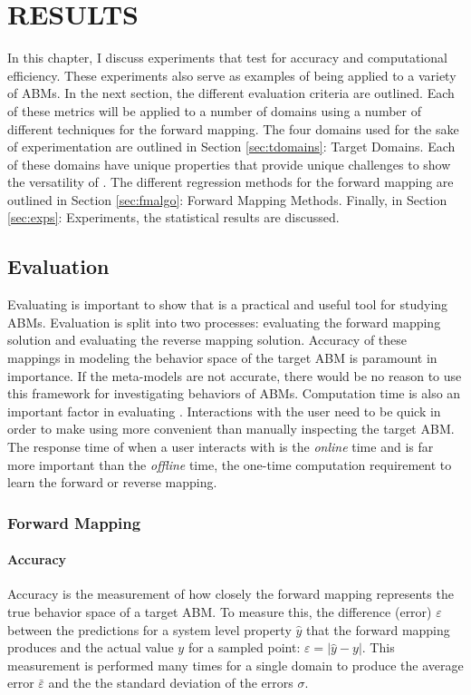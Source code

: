 \chapter{RESULTS}
\thispagestyle{plain}

\label{Results}

In this chapter, I discuss experiments that test \fw for accuracy and computational efficiency.
These experiments also serve as examples of \fw being applied to a variety of ABMs.
In the next section, the different evaluation criteria are outlined.
Each of these metrics will be applied to a number of domains using a number of different techniques for the forward mapping.
The four domains used for the sake of experimentation are outlined in Section \ref{sec:tdomains}: Target Domains.
Each of these domains have unique properties that provide unique challenges to show the versatility of \fw.
The different regression methods for the forward mapping are outlined in Section \ref{sec:fmalgo}: Forward Mapping Methods.
Finally, in Section \ref{sec:exps}: Experiments, the statistical results are discussed.

\section{Evaluation}

Evaluating \fw is important to show that \fw is a practical and useful tool for studying ABMs.
Evaluation is split into two processes: evaluating the forward mapping solution and evaluating the reverse mapping solution.
Accuracy of these mappings in modeling the behavior space of the target ABM is paramount in importance.
If the meta-models are not accurate, there would be no reason to use this framework for investigating behaviors of ABMs.
Computation time is also an important factor in evaluating \fw.
Interactions with the user need to be quick in order to make using \fw more convenient than manually inspecting the target ABM.
The response time of when a user interacts with \fw is the \textit{online} time and is far more important than the \textit{offline} time, the one-time computation requirement to learn the forward or reverse mapping.


 \subsection{Forward Mapping}

  \subsubsection{Accuracy}
Accuracy is the measurement of how closely the forward mapping represents the true behavior space of a target ABM.
To measure this, the difference (error) $\varepsilon$ between the predictions for a system level property $\hat y$ that the forward mapping produces and the actual value $y$ for a sampled point: $\varepsilon = |\hat y - y|$.
This measurement is performed many times for a single domain to produce the average error $\bar \varepsilon$ and the the standard deviation of the errors $\sigma$.

